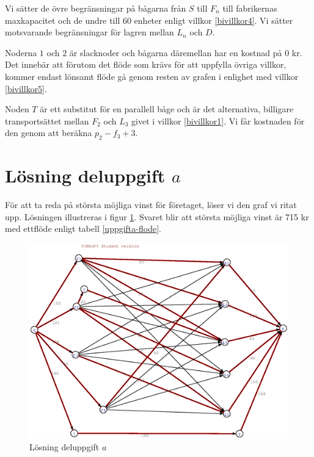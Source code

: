 \documentclass[titlepage, a4paper]{article}
\begin{document}
Vi sätter de övre begränsningar på bågarna från $S$ till $F_{n}$ till fabrikernas maxkapacitet och de undre till 60 enheter enligt villkor \ref{bivillkor4}. Vi sätter motsvarande begränsningar för lagren mellan $L_{n}$ och $D$.

Noderna $1$ och $2$ är slacknoder och bågarna däremellan har en kostnad på 0 kr. Det innebär att förutom det flöde som krävs för att uppfylla övriga villkor, kommer endast lönsamt flöde gå genom resten av grafen i enlighet med villkor \ref{bivillkor5}.

Noden $T$ är ett substitut för en parallell båge och är det alternativa, billigare transportsättet mellan $F_{2}$ och $L_{3}$ givet i villkor \ref{bivillkor1}. Vi får kostnaden för den genom att beräkna $p_{2}-f_{3}+3$.

\section{Lösning deluppgift $a$}

För att ta reda på största möjliga vinst för företaget, löser vi den graf vi ritat upp. Lösningen illustreras i figur \ref{uppgifta-losning}. Svaret blir att största möjliga vinst är 715 kr med ettflöde enligt tabell \ref{uppgifta-flode}.

\begin{figure}[h!]
\centerline{\includegraphics[scale=0.65]{laborationsuppgift_13a_solved.ps}}
\caption{Lösning deluppgift $a$} \label{uppgifta-losning}
\end{figure}
\end{document}
